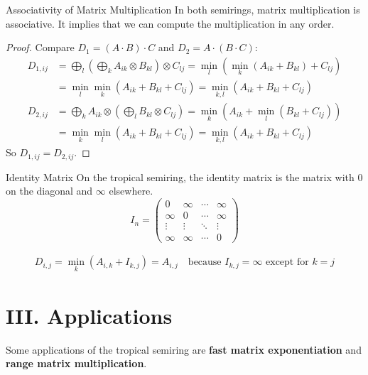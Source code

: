 \documentclass{article}
\begin{document}
\begin{myproperty}{Associativity of Matrix Multiplication}
In both semirings, matrix multiplication is associative. It implies that we can compute the multiplication in any order.
\end{myproperty}

\begin{proof}
Compare $D_1 = (A \cdot B) \cdot C$ and $D_2 = A \cdot (B \cdot C)$:
\[
\begin{aligned}
D_{1,ij} &= \bigoplus_l \left( \bigoplus_k A_{ik} \otimes B_{kl} \right) \otimes C_{lj} = \min_l \left( \min_k (A_{ik} + B_{kl}) + C_{lj} \right) \\
&= \min_l \min_k (A_{ik} + B_{kl} + C_{lj}) = \min_{k,l} (A_{ik} + B_{kl} + C_{lj})
\end{aligned}
\]
\[
\begin{aligned}
D_{2,ij} &= \bigoplus_k A_{ik} \otimes \left( \bigoplus_l B_{kl} \otimes C_{lj} \right) = \min_k \left( A_{ik} + \min_l (B_{kl} + C_{lj}) \right) \\
&= \min_k \min_l (A_{ik} + B_{kl} + C_{lj}) = \min_{k,l} (A_{ik} + B_{kl} + C_{lj})
\end{aligned}
\]
So $D_{1,ij} = D_{2,ij}$.
\end{proof}

\begin{mydefinition}{Identity Matrix}
On the tropical semiring, the identity matrix is the matrix with $0$ on the diagonal and $\infty$ elsewhere.
\[
I_{n} = \begin{pmatrix}
0 & \infty & \cdots & \infty \\
\infty & 0 & \cdots & \infty \\
\vdots & \vdots & \ddots & \vdots \\
\infty & \infty & \cdots & 0
\end{pmatrix}
\]
\end{mydefinition}

\[
\begin{aligned}
    D_{i, j} = \min_k (A_{i, k} + I_{k, j}) = A_{i, j} \quad \text{because } I_{k, j} = \infty \text{ except for } k = j
\end{aligned}
\]

\section*{III. Applications}

Some applications of the tropical semiring are \textbf{fast matrix exponentiation} and \textbf{range matrix multiplication}.
\end{document}
